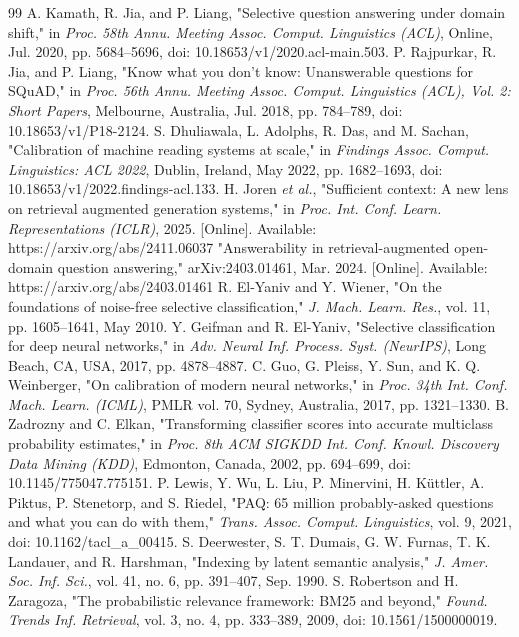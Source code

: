 \documentclass[conference]{IEEEtran}
\begin{document}
\begin{thebibliography}{99}\footnotesize
{} A. Kamath, R. Jia, and P. Liang, "Selective question answering under domain shift," in \emph{Proc. 58th Annu. Meeting Assoc. Comput. Linguistics (ACL)}, Online, Jul. 2020, pp. 5684--5696, doi: 10.18653/v1/2020.acl-main.503.
 P. Rajpurkar, R. Jia, and P. Liang, "Know what you don't know: Unanswerable questions for SQuAD," in \emph{Proc. 56th Annu. Meeting Assoc. Comput. Linguistics (ACL), Vol. 2: Short Papers}, Melbourne, Australia, Jul. 2018, pp. 784--789, doi: 10.18653/v1/P18-2124.
 S. Dhuliawala, L. Adolphs, R. Das, and M. Sachan, "Calibration of machine reading systems at scale," in \emph{Findings Assoc. Comput. Linguistics: ACL 2022}, Dublin, Ireland, May 2022, pp. 1682--1693, doi: 10.18653/v1/2022.findings-acl.133.
 H. Joren \emph{et al.}, "Sufficient context: A new lens on retrieval augmented generation systems," in \emph{Proc. Int. Conf. Learn. Representations (ICLR)}, 2025. [Online]. Available: https://arxiv.org/abs/2411.06037
 "Answerability in retrieval-augmented open-domain question answering," arXiv:2403.01461, Mar. 2024. [Online]. Available: https://arxiv.org/abs/2403.01461
 R. El-Yaniv and Y. Wiener, "On the foundations of noise-free selective classification," \emph{J. Mach. Learn. Res.}, vol. 11, pp. 1605--1641, May 2010.
 Y. Geifman and R. El-Yaniv, "Selective classification for deep neural networks," in \emph{Adv. Neural Inf. Process. Syst. (NeurIPS)}, Long Beach, CA, USA, 2017, pp. 4878--4887.
 C. Guo, G. Pleiss, Y. Sun, and K. Q. Weinberger, "On calibration of modern neural networks," in \emph{Proc. 34th Int. Conf. Mach. Learn. (ICML)}, PMLR vol. 70, Sydney, Australia, 2017, pp. 1321--1330.
 B. Zadrozny and C. Elkan, "Transforming classifier scores into accurate multiclass probability estimates," in \emph{Proc. 8th ACM SIGKDD Int. Conf. Knowl. Discovery Data Mining (KDD)}, Edmonton, Canada, 2002, pp. 694--699, doi: 10.1145/775047.775151.
 P. Lewis, Y. Wu, L. Liu, P. Minervini, H. K\"uttler, A. Piktus, P. Stenetorp, and S. Riedel, "PAQ: 65 million probably-asked questions and what you can do with them," \emph{Trans. Assoc. Comput. Linguistics}, vol. 9, 2021, doi: 10.1162/tacl\_a\_00415.
 S. Deerwester, S. T. Dumais, G. W. Furnas, T. K. Landauer, and R. Harshman, "Indexing by latent semantic analysis," \emph{J. Amer. Soc. Inf. Sci.}, vol. 41, no. 6, pp. 391--407, Sep. 1990.
 S. Robertson and H. Zaragoza, "The probabilistic relevance framework: BM25 and beyond," \emph{Found. Trends Inf. Retrieval}, vol. 3, no. 4, pp. 333--389, 2009, doi: 10.1561/1500000019.
\end{thebibliography}
\end{document}
